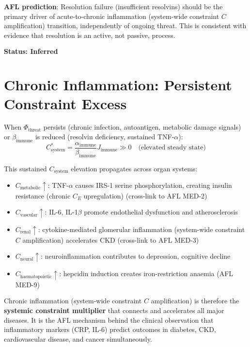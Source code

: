\documentclass[12pt,a4paper]{article}
\begin{document}
\textbf{AFL prediction}: Resolution failure (insufficient resolvins) should be the primary driver of acute-to-chronic inflammation (system-wide constraint $C$ amplification) transition, independently of ongoing threat. This is consistent with evidence that resolution is an active, not passive, process.

\textbf{Status: Inferred}

\section{Chronic Inflammation: Persistent Constraint Excess}

When $\Phi_{\mathrm{threat}}$ persists (chronic infection, autoantigen, metabolic damage signals) or $\beta_{\mathrm{immune}}$ is reduced (resolvin deficiency, sustained TNF-$\alpha$):
\begin{equation}
    C_{\mathrm{system}}^* = \frac{\alpha_{\mathrm{immune}}}{\beta_{\mathrm{immune}}} J_{\mathrm{immune}} \gg 0 \quad \text{(elevated steady state)}
\end{equation}

This sustained $C_{\mathrm{system}}$ elevation propagates across organ systems:
\begin{itemize}
    \item $C_{\mathrm{metabolic}} \uparrow$: TNF-$\alpha$ causes IRS-1 serine phosphorylation, creating insulin resistance (chronic $C_E$ upregulation) (cross-link to AFL MED-2)
    \item $C_{\mathrm{vascular}} \uparrow$: IL-6, IL-1$\beta$ promote endothelial dysfunction and atherosclerosis
    \item $C_{\mathrm{renal}} \uparrow$: cytokine-mediated glomerular inflammation (system-wide constraint $C$ amplification) accelerates CKD (cross-link to AFL MED-3)
    \item $C_{\mathrm{neural}} \uparrow$: neuroinflammation contributes to depression, cognitive decline
    \item $C_{\mathrm{haematopoietic}} \uparrow$: hepcidin induction creates iron-restriction anaemia (AFL MED-9)
\end{itemize}

Chronic inflammation (system-wide constraint $C$ amplification) is therefore the \textbf{systemic constraint multiplier} that connects and accelerates all major diseases. It is the AFL mechanism behind the clinical observation that inflammatory markers (CRP, IL-6) predict outcomes in diabetes, CKD, cardiovascular disease, and cancer simultaneously.
\end{document}
